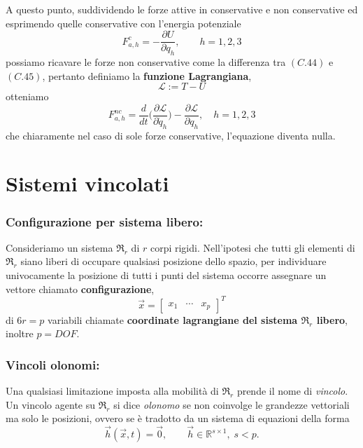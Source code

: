 A questo punto, suddividendo le forze attive in conservative e non conservative ed esprimendo quelle conservative con l'energia potenziale 
\begin{equation}
	F_{a,h}^c = - \frac{\partial U}{\partial q_h}, \qquad h = 1,2,3
\end{equation}
possiamo ricavare le forze non conservative come la differenza tra $(C.44)$ e $(C.45)$, pertanto definiamo la \textbf{funzione Lagrangiana},
\begin{equation}
	\mathcal{L} := T - U
\end{equation}
otteniamo
\begin{equation}
	F_{a,h}^{nc} = \frac{d}{dt} \Biggl( \frac{\partial \mathcal{L}}{\partial \dot{q}_h} \Biggr) - \frac{\partial \mathcal{L}}{\partial q_h}, \quad h = 1,2,3
\end{equation}
che chiaramente nel caso di sole forze conservative, l'equazione diventa nulla.

\section{Sistemi vincolati}
\subsubsection{Configurazione per sistema libero:}
Consideriamo un sistema $\mathfrak{R}_r$ di $r$ corpi rigidi. Nell'ipotesi che tutti gli elementi di $\mathfrak{R}_r$ siano liberi di occupare qualsiasi posizione dello spazio, per individuare univocamente la posizione di tutti i punti del sistema occorre assegnare un vettore chiamato \textbf{configurazione},
\begin{equation}
	\vec{x} = 
	\begin{bmatrix}
		x_1 & \cdots & x_p
	\end{bmatrix}^T
\end{equation}
di $6r = p$ variabili chiamate \textbf{coordinate lagrangiane del sistema $\mathfrak{R}_r$ libero}, inoltre $p = DOF$.
\subsubsection{Vincoli olonomi:}
Una qualsiasi limitazione imposta alla mobilità di $\mathfrak{R}_r$ prende il nome di \emph{vincolo}. Un vincolo agente su $\mathfrak{R}_r$ si dice \emph{olonomo} se non coinvolge le grandezze vettoriali ma solo le posizioni, ovvero se è tradotto da un sistema di equazioni della forma
\begin{equation}
	\vec{h}(\vec{x},t) = \vec{0}, \qquad \vec{h} \in \mathbb{R}^{s \times 1},\; s < p. 
\end{equation}

